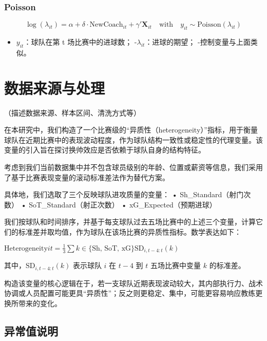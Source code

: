 \documentclass[
]{ctexart}
\providecommand{\tightlist}{%
  \setlength{\itemsep}{0pt}\setlength{\parskip}{0pt}}\usepackage{longtable,booktabs,array}
\begin{document}
\subsubsection{Poisson}\label{poisson}

\[
\log(\lambda_{it}) = \alpha + \delta \cdot \text{NewCoach}_{it} + \gamma' \mathbf{X}_{it}
\quad \text{with} \quad y_{it} \sim \text{Poisson}(\lambda_{it})
\]

\begin{itemize}
\tightlist
\item
  \(y_{it}\)：球队在第 t 场比赛中的进球数；
  -\(\lambda_{it}\)：进球的期望； -控制变量与上面类似。
\end{itemize}

\section{数据来源与处理}\label{ux6570ux636eux6765ux6e90ux4e0eux5904ux7406}

（描述数据来源、样本区间、清洗方式等）

在本研究中，我们构造了一个比赛级的``异质性（heterogeneity）''指标，用于衡量球队在近期比赛中的表现波动程度，作为球队结构一致性或稳定性的代理变量。该变量的引入旨在探讨换帅效应是否依赖于球队自身的结构特征。

考虑到我们当前数据集中并不包含球员级别的年龄、位置或薪资等信息，我们采用了基于比赛表现变量的滚动标准差法作为替代方案。

具体地，我们选取了三个反映球队进攻质量的变量： •
Sh\_Standard（射门次数） • SoT\_Standard（射正次数） •
xG\_Expected（预期进球）

我们按球队和时间排序，并基于每支球队过去五场比赛中的上述三个变量，计算它们的标准差并取均值，作为球队在该场比赛的异质性指标。数学表达如下：

\(\text{Heterogeneity}{it} = \frac{1}{3} \sum{k \in \{\text{Sh, SoT, xG}\}} \text{SD}_{i,t-4:t}(k)\)

其中，\(\text{SD}_{i,t-4:t}(k)\) 表示球队 \(i\) 在 \(t-4\) 到 \(t\)
五场比赛中变量 \(k\) 的标准差。

构造该变量的核心逻辑在于，若一支球队近期表现波动较大，其内部执行力、战术协调或人员配置可能更具``异质性''；反之则更稳定、集中，可能更容易响应教练更换所带来的变化。

\subsection{异常值说明}\label{ux5f02ux5e38ux503cux8bf4ux660e}
\end{document}
